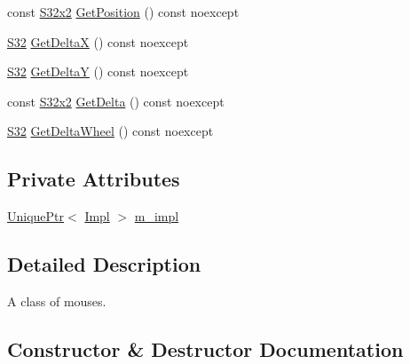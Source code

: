 \begin{DoxyCompactItemize}
\item 
const \mbox{\hyperlink{namespacemage_a4843c424aae7bb5fb6c440ed6ed593ee}{S32x2}} \mbox{\hyperlink{classmage_1_1input_1_1_mouse_a8127f78dd1fb1eba29c3888d40db97da}{Get\+Position}} () const noexcept
\item 
\mbox{\hyperlink{namespacemage_a642e05c5c83642b6946703615cdbf2da}{S32}} \mbox{\hyperlink{classmage_1_1input_1_1_mouse_ac15719c468a94885a256e34b27cf2ca5}{Get\+DeltaX}} () const noexcept
\item 
\mbox{\hyperlink{namespacemage_a642e05c5c83642b6946703615cdbf2da}{S32}} \mbox{\hyperlink{classmage_1_1input_1_1_mouse_a448886ed21c136f1a385101e21093aa3}{Get\+DeltaY}} () const noexcept
\item 
const \mbox{\hyperlink{namespacemage_a4843c424aae7bb5fb6c440ed6ed593ee}{S32x2}} \mbox{\hyperlink{classmage_1_1input_1_1_mouse_a6f789e976d80c6f9c92388e3cf3502d6}{Get\+Delta}} () const noexcept
\item 
\mbox{\hyperlink{namespacemage_a642e05c5c83642b6946703615cdbf2da}{S32}} \mbox{\hyperlink{classmage_1_1input_1_1_mouse_a71d088496a46d2915eb3fb8ba7dbb8e5}{Get\+Delta\+Wheel}} () const noexcept
\end{DoxyCompactItemize}
\subsection*{Private Attributes}
\begin{DoxyCompactItemize}
\item 
\mbox{\hyperlink{namespacemage_a3316d7143a973e37adf1110f2e80ca31}{Unique\+Ptr}}$<$ \mbox{\hyperlink{classmage_1_1input_1_1_mouse_1_1_impl}{Impl}} $>$ \mbox{\hyperlink{classmage_1_1input_1_1_mouse_a9056beca36df1fd7947cf7002aec99b6}{m\+\_\+impl}}
\end{DoxyCompactItemize}


\subsection{Detailed Description}
A class of mouses. 

\subsection{Constructor \& Destructor Documentation}
\mbox{\label{classmage_1_1input_1_1_mouse_add3fd231e5af4f3669eaa8d5f8d157ec}} 
